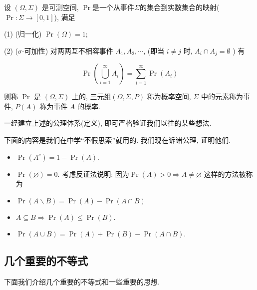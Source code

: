 \documentclass{ctexart}
\begin{document}
\begin{definition}
    设 $(\Omega, \Sigma)$ 是可测空间, $\Pr$是一个从事件$\Sigma$的集合到实数集合的映射($\Pr:\Sigma\to [0,1]$), 满足

(1) (归一化) $\Pr(\Omega)=1$;


(2) ($\sigma$-可加性) 对两两互不相容事件 $A_{1}, A_{2}, \cdots$, (即当 $i \neq j$ 时, $A_{i} \cap A_{j}=\emptyset$ ) 有

$$
\Pr\left(\bigcup_{i=1}^{\infty} A_{i}\right)=\sum_{i=1}^{\infty} \Pr\left(A_{i}\right)
$$

则称 $\Pr$ 是 $(\Omega, \Sigma)$ 上的, 三元组$(\Omega, \Sigma, P)$ 称为概率空间, $\Sigma$ 中的元素称为事件, $P(A)$ 称为事件 $A$ 的概率.
\end{definition}

一经建立上述的公理体系(定义), 即可严格验证我们以往的某些想法.  

\begin{example}
    下面的内容是我们在中学``不假思索''就用的. 我们现在诉诸公理, 证明他们.

    \begin{itemize}
        \item $\operatorname{Pr}\left(A^c\right)=1-\operatorname{Pr}(A)$. 
        \item $\operatorname{Pr}(\varnothing)=0$. 考虑反证法说明: 因为$\operatorname{Pr}(A)>0 \Longrightarrow A \neq \varnothing$ 这样的方法被称为 %
        \item $\operatorname{Pr}(A \backslash B)=\operatorname{Pr}(A)-\operatorname{Pr}(A \cap B)$ 
        \item $A \subseteq B \Longrightarrow \operatorname{Pr}(A) \leq \operatorname{Pr}(B)$. 
        \item $\operatorname{Pr}(A \cup B)=\operatorname{Pr}(A)+\operatorname{Pr}(B)-\operatorname{Pr}(A \cap B). $
    \end{itemize}
\end{example}

\subsection{几个重要的不等式} 下面我们介绍几个重要的不等式和一些重要的思想.  
\end{document}
